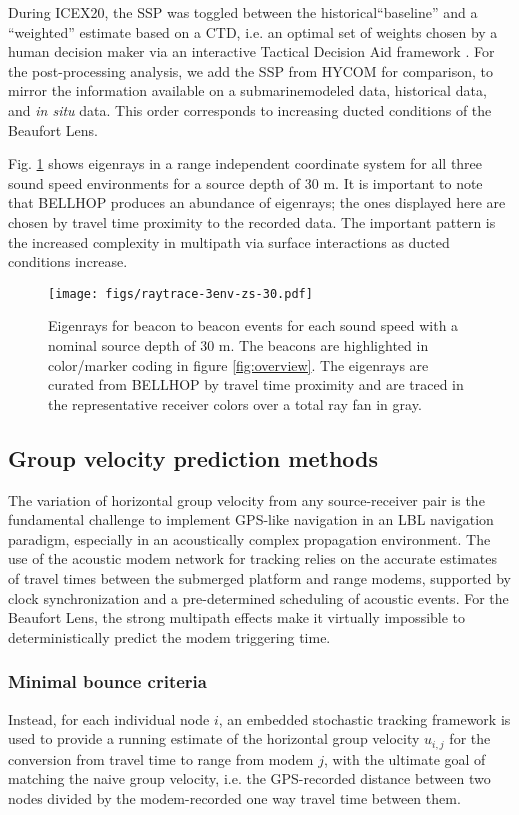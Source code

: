 During ICEX20, the SSP was toggled between the historical``baseline'' and a ``weighted'' estimate based on a CTD, i.e. an optimal set of weights chosen by a human decision maker via an interactive Tactical Decision Aid framework \citep{bhatt_embedded_2021}.
For the post-processing analysis, we add the SSP from HYCOM for comparison, to mirror the information available on a submarine\textemdash modeled data, historical data, and \textit{in situ} data.
This order corresponds to increasing ducted conditions of the Beaufort Lens.

Fig. \ref{fig:raytrace-zs30} shows eigenrays in a range independent coordinate system for all three sound speed environments for a source depth of 30 m.
It is important to note that BELLHOP produces an abundance of eigenrays; the ones displayed here are chosen by travel time proximity to the recorded data.
The important pattern is the increased complexity in multipath via surface interactions as ducted conditions increase.

\begin{figure}[h!]
  \centering
  \texttt{[image: figs/raytrace-3env-zs-30.pdf]}
  \caption{Eigenrays for beacon to beacon events for each sound speed with a nominal source depth of 30 m. The beacons are highlighted in color/marker coding in figure \ref{fig:overview}. The eigenrays are curated from BELLHOP by travel time proximity and are traced in the representative receiver colors over a total ray fan in gray.}
  \label{fig:raytrace-zs30}
  \end{figure}

\FloatBarrier
\subsection{Group velocity prediction methods}

The variation of horizontal group velocity from any source-receiver pair is the fundamental challenge to implement GPS-like navigation in an LBL navigation paradigm, especially in an acoustically complex propagation environment.
The use of the acoustic modem network for tracking relies on the accurate estimates of travel times between the submerged platform and range modems, supported by clock synchronization and a pre-determined scheduling of acoustic events.
For the Beaufort Lens, the strong multipath effects make it virtually impossible to deterministically predict the modem triggering time.

\subsubsection{Minimal bounce criteria}
Instead, for each individual node $i$, an embedded stochastic tracking framework is used to provide a running estimate of the horizontal group velocity $u_{i,j}$ for the conversion from travel time to range from modem $j$, with the ultimate goal of matching the naive group velocity, i.e. the GPS-recorded distance between two nodes divided by the modem-recorded one way travel time between them. 

